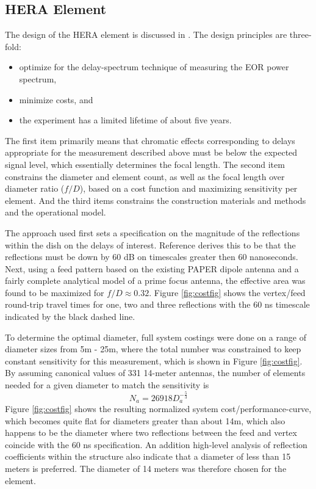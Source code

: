 \documentclass{article}
\begin{document}
\subsection{HERA Element}
\label{sec:element}
The design of the HERA element is discussed in \cite{heraMemo5}.  The design principles are three-fold:
\begin{itemize}
\item optimize for the delay-spectrum technique of measuring the EOR power spectrum,
\item minimize costs, and
\item the experiment has a limited lifetime of about five years.
\end{itemize}
The first item primarily means that chromatic effects corresponding to delays appropriate for the measurement described above must be below the expected signal level, which essentially determines the focal length.  The second item constrains the diameter and element count, as well as the focal length over diameter ratio ($f/D$), based on a cost function and maximizing sensitivity per element.  And the third items constrains the construction materials and methods and the operational model.

The approach used first sets a specification on the magnitude of the reflections within the dish on the delays of interest.  Reference \cite{heraMemo5} derives this to be that the reflections must be down by 60 dB on timescales greater then 60 nanoseconds.  
Next, using a feed pattern based on the existing PAPER dipole antenna and a fairly complete analytical model of a prime focus antenna, the effective area was found to be maximized for $f/D \approx 0.32$.  Figure \ref{fig:costfig} shows the vertex/feed round-trip travel times for one, two and three reflections with the 60 ns timescale indicated by the black dashed line. 

To determine the optimal diameter, full system costings were done on a range of diameter sizes from 5m - 25m, where the total number was constrained to keep constant sensitivity for this measurement, which is shown in Figure \ref{fig:costfig}.  By assuming canonical values of 331 14-meter antennas, the number of elements needed for a given diameter to match the sensitivity is
\begin{equation}
N_a = 26918D_a^{-\frac{5}{3}}
\end{equation}
Figure \ref{fig:costfig} shows the resulting normalized system cost/performance-curve, which becomes quite flat for diameters greater than about 14m, which also happens to be the diameter where two reflections between the feed and vertex coincide with the 60 ns specification.  An addition high-level analysis of reflection coefficients within the structure also indicate that a diameter of less than 15 meters is preferred.  The diameter of 14 meters was therefore chosen for the element.
\end{document}
